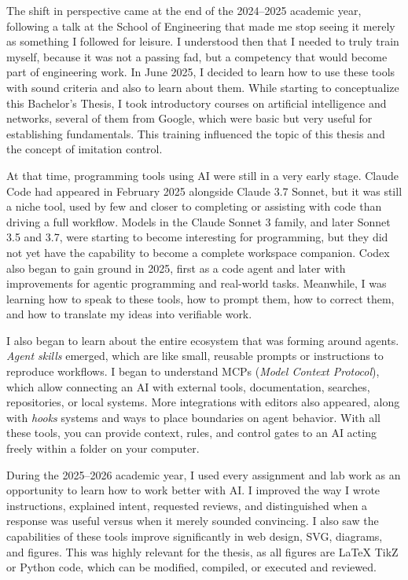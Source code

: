The shift in perspective came at the end of the 2024--2025 academic year, following a talk at the School of Engineering that made me stop seeing it merely as something I followed for leisure. I understood then that I needed to truly train myself, because it was not a passing fad, but a competency that would become part of engineering work. In June 2025, I decided to learn how to use these tools with sound criteria and also to learn about them. While starting to conceptualize this Bachelor's Thesis, I took introductory courses on artificial intelligence and networks, several of them from Google, which were basic but very useful for establishing fundamentals. This training influenced the topic of this thesis and the concept of imitation control.

At that time, programming tools using AI were still in a very early stage. Claude Code had appeared in February 2025 alongside Claude 3.7 Sonnet, but it was still a niche tool, used by few and closer to completing or assisting with code than driving a full workflow. Models in the Claude Sonnet 3 family, and later Sonnet 3.5 and 3.7, were starting to become interesting for programming, but they did not yet have the capability to become a complete workspace companion. Codex also began to gain ground in 2025, first as a code agent and later with improvements for agentic programming and real-world tasks. Meanwhile, I was learning how to speak to these tools, how to prompt them, how to correct them, and how to translate my ideas into verifiable work.

I also began to learn about the entire ecosystem that was forming around agents. \textit{Agent skills} emerged, which are like small, reusable prompts or instructions to reproduce workflows. I began to understand MCPs (\textit{Model Context Protocol}), which allow connecting an AI with external tools, documentation, searches, repositories, or local systems. More integrations with editors also appeared, along with \textit{hooks} systems and ways to place boundaries on agent behavior. With all these tools, you can provide context, rules, and control gates to an AI acting freely within a folder on your computer.

During the 2025--2026 academic year, I used every assignment and lab work as an opportunity to learn how to work better with AI. I improved the way I wrote instructions, explained intent, requested reviews, and distinguished when a response was useful versus when it merely sounded convincing. I also saw the capabilities of these tools improve significantly in web design, SVG, diagrams, and figures. This was highly relevant for the thesis, as all figures are LaTeX TikZ or Python code, which can be modified, compiled, or executed and reviewed.

